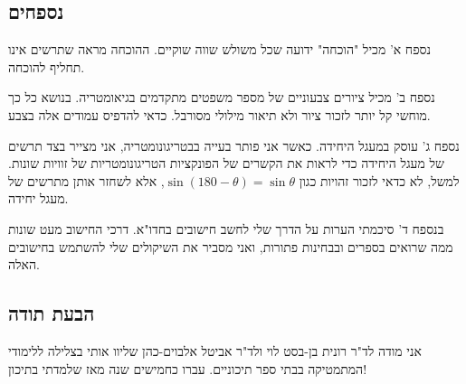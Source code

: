 \vspace{-3ex}


\subsection*{נספחים}

נספח א' מכיל "הוכחה" ידועה שכל משולש שווה שוקיים. ההוכחה מראה שתרשים אינו תחליף להוכחה.

נספח ב' מכיל ציורים צבעוניים של מספר משפטים מתקדמים בגיאומטריה. בנושא כל כך מוחשי קל יותר לזכור ציור ולא תיאור מילולי מסורבל. כדאי להדפיס עמודים אלה בצבע.

נספח ג' עוסק במעגל היחידה. כאשר אני פותר בעייה בבטריגונומטריה, אני מצייר בצד תרשים של מעגל היחידה כדי לראות את הקשרים של הפונקציות  הטריגונומטריות של זוויות שונות.  למשל, לא כדאי לזכור זהויות כגון
$\sin (180\!-\!\theta)=\sin \theta$,
אלא לשחזר אותן מתרשים של מעגל יחידה.

בנספח ד' סיכמתי הערות על הדרך שלי לחשב חישובים בחדו"א. דרכי החישוב מעט שונות ממה שרואים בספרים ובבחינות פתורות, ואני מסביר את השיקולים שלי להשתמש בחישובים האלה.

\subsection*{הבעת תודה}

אני מודה לד"ר רונית בן-בסט לוי ולד"ר אביטל אלבוים-כהן שליוו אותי בצלילה ללימודי המתמטיקה בבתי ספר תיכוניים. עברו כחמישים שנה מאז שלמדתי בתיכון!
